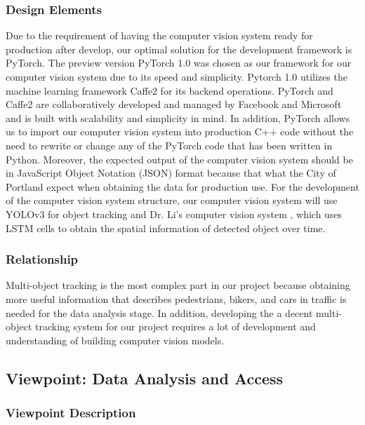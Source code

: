\subsubsection{Design Elements}

Due to the requirement of having the computer vision system ready for production after develop, our optimal solution for the development framework is PyTorch. The preview version PyTorch 1.0 was chosen as our framework for our computer vision system due to its speed and simplicity. Pytorch 1.0 utilizes the machine learning framework Caffe2 for its backend operations. PyTorch and Caffe2 are collaboratively developed and managed by Facebook and Microsoft and is built with scalability and simplicity in mind. In addition, PyTorch allows us to import our computer vision system into production C++ code without the need to rewrite or change any of the PyTorch code that has been written in Python. Moreover, the expected output of the computer vision system should be in JavaScript Object Notation (JSON) format because that what the City of Portland expect when obtaining the data for production use. For the development of the computer vision system structure, our computer vision system will use YOLOv3 for object tracking and Dr. Li's computer vision system \cite{limodel}, which uses LSTM cells to obtain the spatial information of detected object over time.

\subsubsection{Relationship}

Multi-object tracking is the most complex part in our project because obtaining more useful information that describes pedestrians, bikers, and cars in traffic is needed for the data analysis stage. In addition, developing the a decent multi-object tracking system for our project requires a lot of development and understanding of building computer vision models.

\subsection{Viewpoint: Data Analysis and Access}

\subsubsection{Viewpoint Description}

